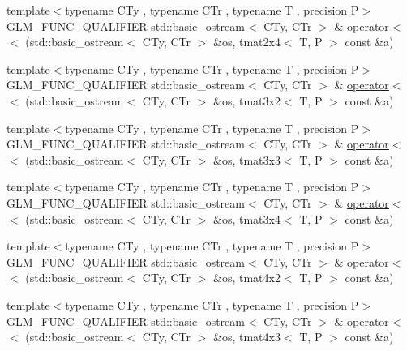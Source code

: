 \begin{DoxyCompactItemize}
\item 
{\footnotesize template$<$typename C\+Ty , typename C\+Tr , typename T , precision P$>$ }\\G\+L\+M\+\_\+\+F\+U\+N\+C\+\_\+\+Q\+U\+A\+L\+I\+F\+I\+E\+R std\+::basic\+\_\+ostream$<$ C\+Ty, C\+Tr $>$ \& \hyperlink{group__gtx__io_ga1a2314cab31da0e736bc5e601bcb8f37}{operator$<$$<$} (std\+::basic\+\_\+ostream$<$ C\+Ty, C\+Tr $>$ \&os, tmat2x4$<$ T, P $>$ const \&a)
\item 
{\footnotesize template$<$typename C\+Ty , typename C\+Tr , typename T , precision P$>$ }\\G\+L\+M\+\_\+\+F\+U\+N\+C\+\_\+\+Q\+U\+A\+L\+I\+F\+I\+E\+R std\+::basic\+\_\+ostream$<$ C\+Ty, C\+Tr $>$ \& \hyperlink{group__gtx__io_gac825ec168ada9209dad314bca460ceef}{operator$<$$<$} (std\+::basic\+\_\+ostream$<$ C\+Ty, C\+Tr $>$ \&os, tmat3x2$<$ T, P $>$ const \&a)
\item 
{\footnotesize template$<$typename C\+Ty , typename C\+Tr , typename T , precision P$>$ }\\G\+L\+M\+\_\+\+F\+U\+N\+C\+\_\+\+Q\+U\+A\+L\+I\+F\+I\+E\+R std\+::basic\+\_\+ostream$<$ C\+Ty, C\+Tr $>$ \& \hyperlink{group__gtx__io_ga3ea3ca90bea2e763079f09af1e5d50ab}{operator$<$$<$} (std\+::basic\+\_\+ostream$<$ C\+Ty, C\+Tr $>$ \&os, tmat3x3$<$ T, P $>$ const \&a)
\item 
{\footnotesize template$<$typename C\+Ty , typename C\+Tr , typename T , precision P$>$ }\\G\+L\+M\+\_\+\+F\+U\+N\+C\+\_\+\+Q\+U\+A\+L\+I\+F\+I\+E\+R std\+::basic\+\_\+ostream$<$ C\+Ty, C\+Tr $>$ \& \hyperlink{group__gtx__io_ga5a5ca6f99c027a2277b24de487198fe0}{operator$<$$<$} (std\+::basic\+\_\+ostream$<$ C\+Ty, C\+Tr $>$ \&os, tmat3x4$<$ T, P $>$ const \&a)
\item 
{\footnotesize template$<$typename C\+Ty , typename C\+Tr , typename T , precision P$>$ }\\G\+L\+M\+\_\+\+F\+U\+N\+C\+\_\+\+Q\+U\+A\+L\+I\+F\+I\+E\+R std\+::basic\+\_\+ostream$<$ C\+Ty, C\+Tr $>$ \& \hyperlink{group__gtx__io_ga8ce3cf61260e62080a9596c2f10ab4a0}{operator$<$$<$} (std\+::basic\+\_\+ostream$<$ C\+Ty, C\+Tr $>$ \&os, tmat4x2$<$ T, P $>$ const \&a)
\item 
{\footnotesize template$<$typename C\+Ty , typename C\+Tr , typename T , precision P$>$ }\\G\+L\+M\+\_\+\+F\+U\+N\+C\+\_\+\+Q\+U\+A\+L\+I\+F\+I\+E\+R std\+::basic\+\_\+ostream$<$ C\+Ty, C\+Tr $>$ \& \hyperlink{group__gtx__io_gaca75b14a0534a02860349a114a10aa44}{operator$<$$<$} (std\+::basic\+\_\+ostream$<$ C\+Ty, C\+Tr $>$ \&os, tmat4x3$<$ T, P $>$ const \&a)

\end{DoxyCompactItemize}
